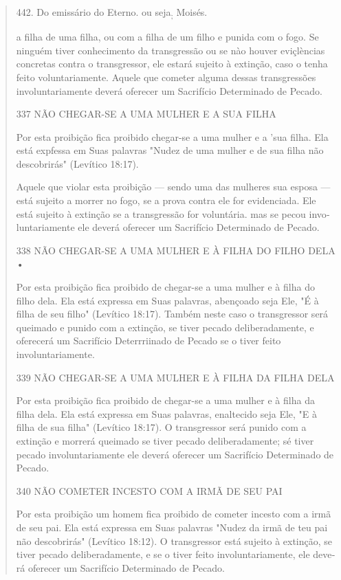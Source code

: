 \begin{quote}
442. Do emissário do Eterno. ou seja\textsubscript{;} Moisés.

a filha de uma filha, ou com a filha de um filho e punida com o fogo. Se
nin­guém tiver conhecimento da transgressão ou se nào houver eviçlèncias
concre­tas contra o transgressor, ele estará sujeito à extinção, caso o
tenha feito volun­tariamente. Aquele que cometer alguma dessas
transgressões involuntariamen­te deverá oferecer um Sacrifício
Determinado de Pecado.

337 NÃO CHEGAR-SE A UMA MULHER E A SUA FILHA

Por esta proibição fica proibido chegar-se a uma mulher e a 'sua fi­lha.
Ela está expfessa em Suas palavras "Nudez de uma mulher e de sua filha
não descobrirás" (Levítico 18:17).

Aquele que violar esta proibição --- sendo uma das mulheres sua es­posa
--- está sujeito a morrer no fogo, se a prova contra ele for
evidenciada. Ele está sujeito à extinção se a transgressão for
voluntária. mas se pecou invo­luntariamente ele deverá oferecer um
Sacrifício Determinado de Pecado.

338 NÃO CHEGAR-SE A UMA MULHER E À FILHA DO FILHO DELA •

Por esta proibição fica proibido de chegar-se a uma mulher e à filha do
filho dela. Ela está expressa em Suas palavras, abençoado seja Ele, "É à
filha de seu filho" (Levítico 18:17). Também neste caso o transgressor
será queima­do e punido com a extinção, se tiver pecado deliberadamente,
e oferecerá um Sacrifício Deterrriinado de Pecado se o tiver feito
involuntariamente.

339 NÃO CHEGAR-SE A UMA MULHER E À FILHA DA FILHA DELA

Por esta proibição fica proibido de chegar-se a uma mulher e à filha da
filha dela. Ela está expressa em Suas palavras, enaltecido seja Ele, "E
à filha de sua filha" (Levítico 18:17). O transgressor será punido com a
extinção e mor­rerá queimado se tiver pecado deliberadamente; sé tiver
pecado involuntaria­mente ele deverá oferecer um Sacrifício Determinado
de Pecado.

340 NÃO COMETER INCESTO COM A IRMÃ DE SEU PAI

Por esta proibição um homem fica proibido de cometer incesto com a irmã
de seu pai. Ela está expressa em Suas palavras "Nudez da irmã de teu pai
não descobrirás" (Levítico 18:12). O transgressor está sujeito à
extinção, se tiver pecado deliberadamente, e se o tiver feito
involuntariamente, ele deve­rá oferecer um Sacrifício Determinado de
Pecado.


\end{quote}
